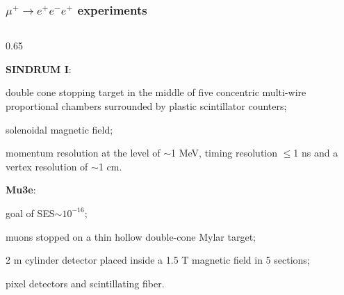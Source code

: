 \documentclass{beamer}
\begin{document}
    \begin{frame}
        \frametitle{$\mu^+  \rightarrow e^+ e^- e^+$ experiments}
        \vspace{-3mm}
\begin{columns}
 \begin{column}{0.65\framewidth}
 \setlength{\leftmargini}{1.1em}

    \begin{itemize}
        {\small     \item \textbf{SINDRUM I}:  }
        \begin{itemize}
            {\small \item  double cone stopping target in the 
            middle of five concentric multi-wire proportional chambers 
            surrounded by plastic scintillator counters;
            \vspace{1mm}
            \item solenoidal magnetic field;
            \vspace{1mm}
            \item momentum resolution at the level of $\sim$1 MeV, 
            timing resolution $\leq$1 ns and a vertex resolution of $\sim$1 cm.
            }
        \end{itemize}
   {\small     \item \textbf{Mu3e}: 
   }
   \begin{itemize}
    {\small \item  goal of SES$\sim 10^{-16}$;
    \vspace{1mm}
    \item muons stopped on a thin hollow double-cone Mylar target;
    \vspace{1mm}
    \item 2 m cylinder detector placed inside a 1.5 T magnetic field in 5 sections;
    \vspace{1mm}
    \item pixel detectors and scintillating fiber.
    }
\end{itemize}



\end{itemize}
\end{column}
\end{columns}
\end{frame}
\end{document}
